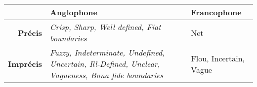 \begin{tabular}{rL{6cm}L{6cm}}
  \toprule
  & {\bfseries Anglophone} & {\bfseries Francophone} \\
  \midrule
   {\bfseries Précis} & \emph{Crisp, Sharp, Well defined, Fiat boundaries} & Net
  \\
  {\bfseries Imprécis} & \emph{Fuzzy, Indeterminate, Undefined, Uncertain,
                         Ill-Defined, Unclear, Vagueness, Bona fide boundaries} & Flou, Incertain, Vague
  \\
  \bottomrule
\end{tabular}